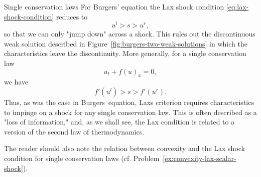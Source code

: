 \begin{Example}{Single conservation laws}
\label{ex:scalar-lax-shock}
For Burgers' equation the Lax shock condition \eqref{eq:lax-shock-condition} reduces to
\begin{equation}\label{eq:burgers-lax-condition}
u^l>s>u^r,
\end{equation}
so that we can only "jump down" across a shock. This rules out the discontinuous weak solution described in Figure~\ref{fig:burgers-two-weak-solutions} in which the characteristics leave the discontinuity. More generally, for a single conservation law
\[
u_t+f(u)_x=0,
\]
we have
\begin{equation}\label{eq:scalar-lax-condition}
f'(u^l)>s>f'(u^r).
\end{equation}
Thus, as was the case in Burgers\textquotesingle\ equation, Lax\textquotesingle s criterion requires characteristics to impinge on a shock for any single conservation law. This is often described as a "loss of information," and, as we shall see, the Lax condition is related to a version of the second law of thermodynamics.

The reader should also note the relation between convexity and the Lax shock condition for single conservation laws (cf. Problem~\ref{ex:convexity-lax-scalar-shock}).
\end{Example}

